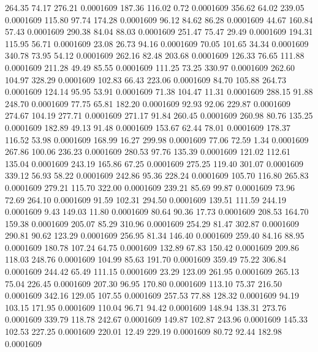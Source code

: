  264.35   74.17  276.21   0.0001609
 187.36  116.02    0.72   0.0001609
 356.62   64.02  239.05   0.0001609
 115.80   97.74  174.28   0.0001609
  96.12   84.62   86.28   0.0001609
  44.67  160.84   57.43   0.0001609
 290.38   84.04   88.03   0.0001609
 251.47   75.47   29.49   0.0001609
 194.31  115.95   56.71   0.0001609
  23.08   26.73   94.16   0.0001609
  70.05  101.65   34.34   0.0001609
 340.78   73.95   54.12   0.0001609
 262.16   82.48  203.68   0.0001609
 126.33   76.65  111.88   0.0001609
 211.28   49.49   85.55   0.0001609
 111.25   73.25  330.97   0.0001609
 262.60  104.97  328.29   0.0001609
 102.83   66.43  223.06   0.0001609
  84.70  105.88  264.73   0.0001609
 124.14   95.95   53.91   0.0001609
  71.38  104.47   11.31   0.0001609
 288.15   91.88  248.70   0.0001609
  77.75   65.81  182.20   0.0001609
  92.93   92.06  229.87   0.0001609
 274.67  104.19  277.71   0.0001609
 271.17   91.84  260.45   0.0001609
 260.98   80.76  135.25   0.0001609
 182.89   49.13   91.48   0.0001609
 153.67   62.44   78.01   0.0001609
 178.37  116.52   53.98   0.0001609
 168.99   16.27  299.98   0.0001609
  77.06   72.59    1.34   0.0001609
 267.86  100.06  236.23   0.0001609
 280.53   97.76  135.39   0.0001609
 121.02  112.61  135.04   0.0001609
 243.19  165.86   67.25   0.0001609
 275.25  119.40  301.07   0.0001609
 339.12   56.93   58.22   0.0001609
 242.86   95.36  228.24   0.0001609
 105.70  116.80  265.83   0.0001609
 279.21  115.70  322.00   0.0001609
 239.21   85.69   99.87   0.0001609
  73.96   72.69  264.10   0.0001609
  91.59  102.31  294.50   0.0001609
 139.51  111.59  244.19   0.0001609
   9.43  149.03   11.80   0.0001609
  80.64   90.36   17.73   0.0001609
 208.53  164.70  159.38   0.0001609
 205.07   85.29  310.96   0.0001609
 254.29   81.47  302.87   0.0001609
 290.81   90.62  123.29   0.0001609
 256.95   81.34  146.40   0.0001609
 259.40   84.16   88.95   0.0001609
 180.78  107.24   64.75   0.0001609
 132.89   67.83  150.42   0.0001609
 209.86  118.03  248.76   0.0001609
 104.99   85.63  191.70   0.0001609
 359.49   75.22  306.84   0.0001609
 244.42   65.49  111.15   0.0001609
  23.29  123.09  261.95   0.0001609
 265.13   75.04  226.45   0.0001609
 207.30   96.95  170.80   0.0001609
 113.10   75.37  216.50   0.0001609
 342.16  129.05  107.55   0.0001609
 257.53   77.88  128.32   0.0001609
  94.19  103.15  171.95   0.0001609
 110.04   96.71   94.42   0.0001609
 148.94  138.31  273.76   0.0001609
 339.79  118.78  242.67   0.0001609
 149.87  102.87  243.96   0.0001609
 145.33  102.53  227.25   0.0001609
 220.01   12.49  229.19   0.0001609
  80.72   92.44  182.98   0.0001609
